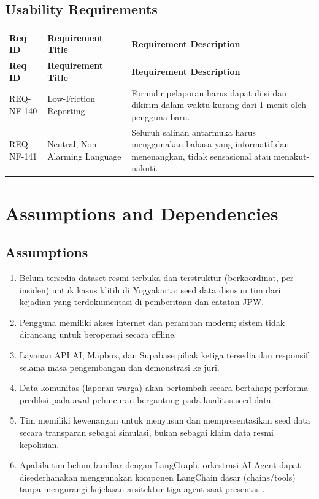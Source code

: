 \documentclass[11pt,a4paper]{article}
\begin{document}
\subsection{Usability Requirements}
\begin{longtable}{|L{2.4cm}|L{4.2cm}|L{7.2cm}|}
\hline
{}\textbf{Req ID} & \textbf{Requirement Title} & \textbf{Requirement Description} \\ \hline
\endfirsthead
\hline
{}\textbf{Req ID} & \textbf{Requirement Title} & \textbf{Requirement Description} \\ \hline
\endhead
REQ-NF-140 & Low-Friction Reporting & Formulir pelaporan harus dapat diisi dan dikirim dalam waktu kurang dari 1 menit oleh pengguna baru. \\ \hline
REQ-NF-141 & Neutral, Non-Alarming Language & Seluruh salinan antarmuka harus menggunakan bahasa yang informatif dan menenangkan, tidak sensasional atau menakut-nakuti. \\ \hline
\end{longtable}

\newpage

\section{Assumptions and Dependencies}

\subsection{Assumptions}
\begin{enumerate}
  \item Belum tersedia dataset resmi terbuka dan terstruktur (berkoordinat, per-insiden) untuk kasus klitih di Yogyakarta; seed data disusun tim dari kejadian yang terdokumentasi di pemberitaan dan catatan JPW.
  \item Pengguna memiliki akses internet dan peramban modern; sistem tidak dirancang untuk beroperasi secara offline.
  \item Layanan API AI, Mapbox, dan Supabase pihak ketiga tersedia dan responsif selama masa pengembangan dan demonstrasi ke juri.
  \item Data komunitas (laporan warga) akan bertambah secara bertahap; performa prediksi pada awal peluncuran bergantung pada kualitas seed data.
  \item Tim memiliki kewenangan untuk menyusun dan mempresentasikan seed data secara transparan sebagai simulasi, bukan sebagai klaim data resmi kepolisian.
  \item Apabila tim belum familiar dengan LangGraph, orkestrasi AI Agent dapat disederhanakan menggunakan komponen LangChain dasar (chains/tools) tanpa mengurangi kejelasan arsitektur tiga-agent saat presentasi.
\end{enumerate}
\end{document}

